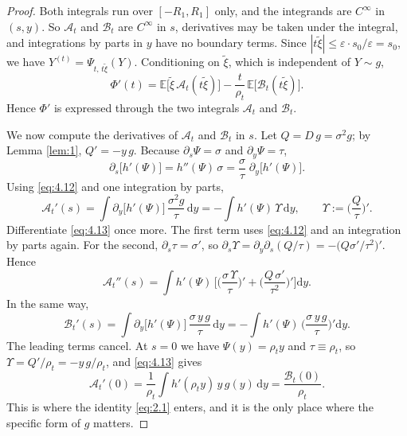 \documentclass[aip,jmp,preprint,onecolumn,floatfix,superscriptaddress,nofootinbib,11pt]{revtex4-2}
\theoremstyle{plain}
\theoremstyle{remark}
\numberwithin{equation}{section}
\newcommand{\dd}{\mathrm{d}}
\newcommand{\E}{\mathbb{E}}
\newcommand{\eps}{\varepsilon}
\begin{document}
\begin{proof}
%
Both integrals run over $[-R_1,R_1]$ only, and the integrands are $C^\infty$ in $(s,y)$. So $\mathcal A_t$ and $\mathcal B_t$ are $C^\infty$ in $s$, derivatives may be taken under the integral, and integrations by parts in $y$ have no boundary terms. Since $|t\tilde\xi|\le\eps\cdot s_0/\eps=s_0$, we have $Y^{(t)}=\Psi_{t,\,t\tilde\xi}(Y)$. Conditioning on $\tilde\xi$, which is independent of $Y\sim g$,
%
\begin{equation}
\Phi'(t)=\E\big[\tilde\xi\,\mathcal A_t(t\tilde\xi)\big]-\frac{t}{\rho_t}\,\E\big[\mathcal B_t(t\tilde\xi)\big].
\label{eq:4.11}
\end{equation}
%
Hence $\Phi'$ is expressed through the two integrals $\mathcal A_t$ and $\mathcal B_t$.
 
We now compute the derivatives of $\mathcal A_t$ and $\mathcal B_t$ in $s$. Let $Q=D\,g=\sigma^{2}g$; by Lemma \ref{lem:1}, $Q'=-y\,g$. Because $\partial_s\Psi=\sigma$ and $\partial_y\Psi=\tau$,
%
\begin{equation}
\partial_s\big[h'(\Psi)\big]=h''(\Psi)\,\sigma=\frac{\sigma}{\tau}\;\partial_y\big[h'(\Psi)\big].
\label{eq:4.12}
\end{equation}
%
Using \eqref{eq:4.12} and one integration by parts,
%
\begin{equation}
\mathcal A_t'(s)=\int\partial_y\big[h'(\Psi)\big]\,\frac{\sigma^{2}g}{\tau}\,\dd y=-\int h'(\Psi)\,\Upsilon\,\dd y,\qquad \Upsilon:=\Big(\frac Q\tau\Big)' .
\label{eq:4.13}
\end{equation}
%
Differentiate \eqref{eq:4.13} once more. The first term uses \eqref{eq:4.12} and an integration by parts again. For the second, $\partial_s\tau=\sigma'$, so $\partial_s\Upsilon=\partial_y\partial_s(Q/\tau)=-\big(Q\sigma'/\tau^{2}\big)'$. Hence
%
\begin{equation}
\mathcal A_t''(s)=\int h'(\Psi)\,\Big[\Big(\frac{\sigma\,\Upsilon}{\tau}\Big)'+\Big(\frac{Q\,\sigma'}{\tau^{2}}\Big)'\Big]\dd y .
\label{eq:4.14}
\end{equation}
%
In the same way,
%
\begin{equation}
\mathcal B_t'(s)=\int\partial_y\big[h'(\Psi)\big]\,\frac{\sigma\,y\,g}{\tau}\,\dd y=-\int h'(\Psi)\,\Big(\frac{\sigma\,y\,g}{\tau}\Big)'\dd y .
\label{eq:4.15}
\end{equation}
%
The leading terms cancel. At $s=0$ we have $\Psi(y)=\rho_ty$ and $\tau\equiv\rho_t$, so $\Upsilon=Q'/\rho_t=-y\,g/\rho_t$, and \eqref{eq:4.13} gives
%
\begin{equation}
\mathcal A_t'(0)=\frac{1}{\rho_t}\int h'(\rho_ty)\,y\,g(y)\,\dd y=\frac{\mathcal B_t(0)}{\rho_t} .
\label{eq:4.16}
\end{equation}
%
This is where the identity \eqref{eq:2.1} enters, and it is the only place where the specific form of $g$ matters.
 

\end{proof}
\end{document}
